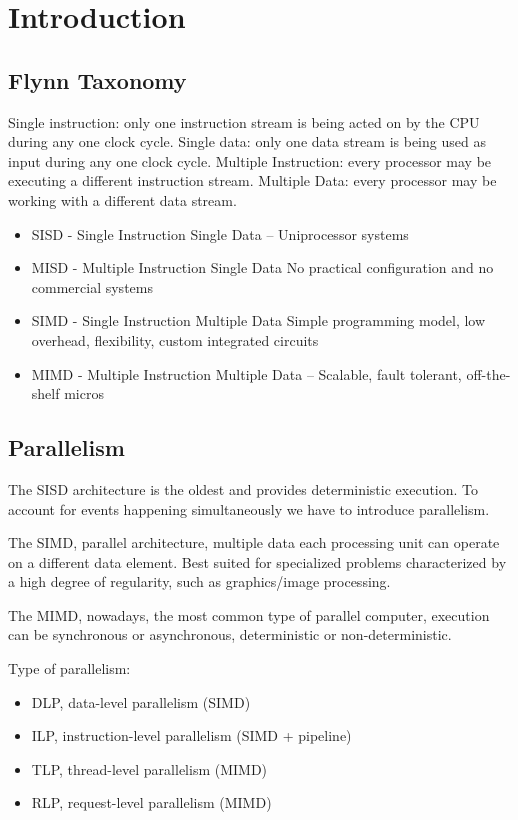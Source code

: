 


\section{Introduction}\label{sec:introduction}


\subsection{Flynn Taxonomy}\label{subsec:taxonomy}
Single instruction: only one instruction stream is being acted on by the CPU during any one clock cycle.
Single data: only one data stream is being used as input during any one clock cycle.
Multiple Instruction: every processor may be executing a different instruction stream.
Multiple Data: every processor may be working with a different data stream.
\begin{itemize}
    \item SISD - Single Instruction Single Data – Uniprocessor systems
    \item MISD - Multiple Instruction Single Data
    No practical configuration and no commercial systems
    \item SIMD - Single Instruction Multiple Data
    Simple programming model, low overhead, flexibility, custom integrated circuits
    \item MIMD - Multiple Instruction Multiple Data – Scalable, fault tolerant, off-the-shelf micros
\end{itemize}

\subsection{Parallelism}\label{subsec:parallelism}
The SISD architecture is the oldest and provides deterministic execution.
To account for events happening simultaneously we have to introduce parallelism.

The SIMD, parallel architecture, multiple data each processing unit can operate on a different data element.
Best suited for specialized problems characterized by a high degree of regularity, such as graphics/image processing.

The MIMD, nowadays, the most common type of parallel computer, execution can be synchronous or asynchronous,
deterministic or non-deterministic.

Type of parallelism:
\begin{itemize}
    \item DLP, data-level parallelism (SIMD)
    \item ILP, instruction-level parallelism (SIMD + pipeline)
    \item TLP, thread-level parallelism (MIMD)
    \item RLP, request-level parallelism (MIMD)
\end{itemize}

